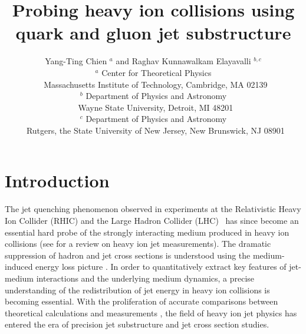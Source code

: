 \documentclass[notoc]{JHEP3}
\title{Probing heavy ion collisions using quark and gluon jet substructure}
\author{Yang-Ting Chien $^{a}$ and Raghav Kunnawalkam Elayavalli $^{b,c}$\\
$^{a}$ Center for Theoretical Physics\\
$~$ Massachusetts Institute of Technology, Cambridge, MA 02139\\
$^{b}$ Department of Physics and Astronomy\\
$~$ Wayne State University, Detroit, MI 48201\\
$^{c}$ Department of Physics and Astronomy\\
$~$ Rutgers, the State University of New Jersey, New Brunswick, NJ 08901
}
\begin{document}
\section{Introduction}
\label{sec:intro}

The jet quenching phenomenon observed in experiments at the Relativistic Heavy Ion Collider (RHIC) \cite{Adcox:2001jp,Adler:2002xw,Adcox:2004mh,Arsene:2004fa,Back:2004je,Adams:2005dq}
and the Large Hadron Collider (LHC)~\cite{Aamodt:2010jd,Aad:2010bu,Chatrchyan:2011sx,Aamodt:2011vg,CMS:2012aa,Chatrchyan:2012nia,Abelev:2012hxa,Chatrchyan:2012gt,Aad:2012vca,
Abelev:2013kqa,Aad:2013sla,Chatrchyan:2013exa,Aad:2014bxa,Khachatryan:2014bva,
Adam:2015ewa,Adam:2015doa,Aad:2015bsa,Khachatryan:2015lha,Aad:2015wga,
Khachatryan:2016odn,Khachatryan:2016xxp,Sirunyan:2016znt,Khachatryan:2016ypw,
Sirunyan:2017isk,Sirunyan:2017oug,Sirunyan:2017lzi,Sirunyan:2017jic,Sirunyan:2017xss,Sirunyan:2017qhf}
has since become an essential hard probe of the strongly interacting medium produced in heavy ion collisions (see \cite{Connors:2017ptx} for a review on heavy ion jet measurements). The dramatic suppression of hadron and jet cross sections is understood using the medium-induced energy loss picture \cite{Gyulassy:1993hr,Wang:1994fx,Zakharov:1996fv,Zakharov:1997uu,Baier:1996kr,Baier:1998kq,
Gyulassy:2000er,Gyulassy:2000fs,Wiedemann:2000za,Wang:2001ifa,
Arnold:2001ba,Arnold:2001ms,Arnold:2002ja,Casalderrey-Solana:2014bpa}. In order to quantitatively extract key features of jet-medium interactions and the underlying medium dynamics, a precise understanding of the redistribution of jet energy in heavy ion collisions is becoming essential. With the proliferation of accurate comparisons between theoretical calculations and measurements \cite{Chatrchyan:2013kwa,Khachatryan:2016tfj,Chatrchyan:2012gw,Aad:2014wha,Chatrchyan:2014ava,Aaboud:2017bzv,Sirunyan:2018qec,Khachatryan:2016erx,
Acharya:2017goa,Sirunyan:2017bsd,CMS:2017xdn}, the field of heavy ion jet physics has entered the era of precision jet substructure and jet cross section studies.
\end{document}
